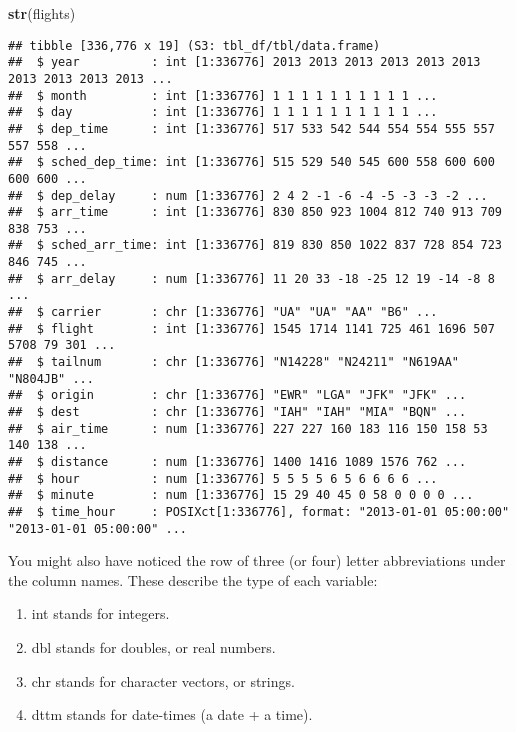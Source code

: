 \documentclass[
]{article}
\newenvironment{Shaded}{\begin{snugshade}}{\end{snugshade}}
\newcommand{\FunctionTok}[1]{\textcolor[rgb]{0.13,0.29,0.53}{\textbf{#1}}}
\newcommand{\NormalTok}[1]{#1}
\providecommand{\tightlist}{%
  \setlength{\itemsep}{0pt}\setlength{\parskip}{0pt}}
\begin{document}
\begin{Shaded}
\begin{Highlighting}[]
\FunctionTok{str}\NormalTok{(flights)}
\end{Highlighting}
\end{Shaded}

\begin{verbatim}
## tibble [336,776 x 19] (S3: tbl_df/tbl/data.frame)
##  $ year          : int [1:336776] 2013 2013 2013 2013 2013 2013 2013 2013 2013 2013 ...
##  $ month         : int [1:336776] 1 1 1 1 1 1 1 1 1 1 ...
##  $ day           : int [1:336776] 1 1 1 1 1 1 1 1 1 1 ...
##  $ dep_time      : int [1:336776] 517 533 542 544 554 554 555 557 557 558 ...
##  $ sched_dep_time: int [1:336776] 515 529 540 545 600 558 600 600 600 600 ...
##  $ dep_delay     : num [1:336776] 2 4 2 -1 -6 -4 -5 -3 -3 -2 ...
##  $ arr_time      : int [1:336776] 830 850 923 1004 812 740 913 709 838 753 ...
##  $ sched_arr_time: int [1:336776] 819 830 850 1022 837 728 854 723 846 745 ...
##  $ arr_delay     : num [1:336776] 11 20 33 -18 -25 12 19 -14 -8 8 ...
##  $ carrier       : chr [1:336776] "UA" "UA" "AA" "B6" ...
##  $ flight        : int [1:336776] 1545 1714 1141 725 461 1696 507 5708 79 301 ...
##  $ tailnum       : chr [1:336776] "N14228" "N24211" "N619AA" "N804JB" ...
##  $ origin        : chr [1:336776] "EWR" "LGA" "JFK" "JFK" ...
##  $ dest          : chr [1:336776] "IAH" "IAH" "MIA" "BQN" ...
##  $ air_time      : num [1:336776] 227 227 160 183 116 150 158 53 140 138 ...
##  $ distance      : num [1:336776] 1400 1416 1089 1576 762 ...
##  $ hour          : num [1:336776] 5 5 5 5 6 5 6 6 6 6 ...
##  $ minute        : num [1:336776] 15 29 40 45 0 58 0 0 0 0 ...
##  $ time_hour     : POSIXct[1:336776], format: "2013-01-01 05:00:00" "2013-01-01 05:00:00" ...
\end{verbatim}

You might also have noticed the row of three (or four) letter
abbreviations under the column names. These describe the type of each
variable:

\begin{enumerate}
\def\labelenumi{\arabic{enumi}.}
\tightlist
\item
  int stands for integers.
\item
  dbl stands for doubles, or real numbers.
\item
  chr stands for character vectors, or strings.
\item
  dttm stands for date-times (a date + a time).
\end{enumerate}
\end{document}
